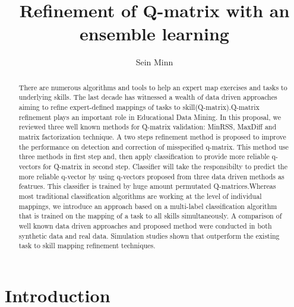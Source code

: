\documentclass[11pt]{article}
\begin{document}
\title{Refinement of Q-matrix with an ensemble learning}
\author{Sein Minn}
\maketitle
\setlength{\parindent}{15pt}

\begin{abstract}
There are numerous algorithms and tools to help an expert map exercises and tasks to underlying skills. The last decade has witnessed a wealth of data driven approaches aiming to refine expert-defined
mappings of tasks to skill(Q-matrix).Q-matrix refinement plays an important role in Educational Data Mining. In this proposal, we reviewed three well known methods for Q-matrix validation: MinRSS, MaxDiff and matrix factorization technique. A two steps refinement method is proposed to improve the performance on detection and correction of misspecified q-matrix. This method use three methods in first step and, then apply classification to provide more reliable q-vectors for Q-matrix in second step. Classifier will take the responsibilty to predict the more reliable q-vector by using q-vectors proposed from three data driven methods as featrues. This classifier is trained by huge amount permutated Q-matrices.Whereas most traditional classification algorithms are working at the level of individual mappings, we introduce an approach based on a multi-label classification algorithm that is trained on the mapping of a task to all skills simultaneously. A comparison of well known data driven approaches and proposed method were conducted in both synthetic data and real data. Simulation studies shown that outperform the existing task to skill mapping refinement techniques. 
\end{abstract}

\section{Introduction}
\end{document}
